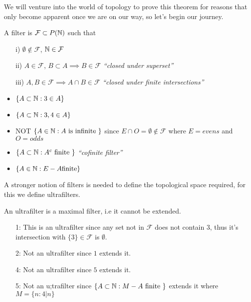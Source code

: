 \documentclass[a4paper]{article}
\renewcommand{\F}{\mathcal{F}}
\begin{document}
  We will venture into the world of topology to prove this theorem for reasons
  that only become apparent once we are on our way, so let's begin our journey.

  \begin{defi}[Filter]
    A filter is $\F \subset P(\N)$ such that
    \begin{itemize}
    \item[i)] $\emptyset \not\in \F$, $\N \in \F$
    \item[ii)] $A \in \F$, $B \subset A \implies B \in \F$ \textit{``closed
        under superset''}
    \item[iii)] $A, B \in \F \implies A \cap B \in \F$ \textit{``closed
        under finite intersections''}
      
    \end{itemize}
  \end{defi}
  \begin{eg}
    \begin{itemize}
    \item $\{ A \subset \mathbb{N} : 3 \in A\}$
    \item $\{ A \subset \mathbb{N} : 3, 4 \in A\}$
    \item NOT $\{A \in \mathbb{N} : A \text{ is infinite }\}$ since $E \cap
      O = \emptyset \not\in \F$ where $E = evens$ and $O = odds$
    \item $\{A \subset \mathbb{N} : A^c \text{ finite }\}$ \textit{``cofinite filter''}
    \item $\{A \in \mathbb{N} : E - A \text{finite}\}$
    \end{itemize}
  \end{eg}
  A stronger notion of filters is needed to define the topological space required,
  for this we define ultrafilters.
  \begin{defi}[Ultrafilter]
    An ultrafilter is a maximal filter, i.e it cannot be extended.
  \end{defi}
  \begin{eg}
    \begin{itemize}
    \item[1:] This is an ultrafilter since any set not in $\F$ does not contain
      $3$, thus it's intersection with $\{3\} \in \F$ is $\emptyset$.
    \item[2:] Not an ultrafilter since $1$ extends it.
    \item[4:] Not an ultrafilter since $5$ extends it.
    \item[5:] Not an u;trafilter since $\{A \subset \mathbb{N} : M - A \text{ finite
      }\}$ extends it where $M = \{n : 4 | n\}$
    \end{itemize}
  \end{eg}
\end{document}
